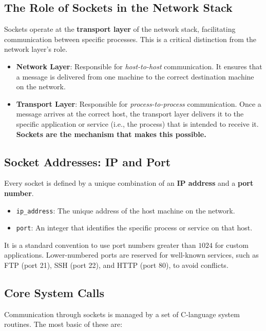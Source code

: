 \documentclass{article}
\begin{document}
\subsection{The Role of Sockets in the Network Stack}

Sockets operate at the \textbf{transport layer} of the network stack, facilitating communication between specific processes. This is a critical distinction from the network layer's role.


\begin{itemize}
    \item \textbf{Network Layer}: Responsible for \textit{host-to-host} communication. It ensures that a message is delivered from one machine to the correct destination machine on the network.
    \item \textbf{Transport Layer}: Responsible for \textit{process-to-process} communication. Once a message arrives at the correct host, the transport layer delivers it to the specific application or service (i.e., the process) that is intended to receive it. \textbf{Sockets are the mechanism that makes this possible.}
\end{itemize}

\subsection{Socket Addresses: IP and Port}

Every socket is defined by a unique combination of an \textbf{IP address} and a \textbf{port number}.

\begin{itemize}
    \item \texttt{ip\_address}: The unique address of the host machine on the network.
    \item \texttt{port}: An integer that identifies the specific process or service on that host.
\end{itemize}

It is a standard convention to use port numbers greater than $1024$ for custom applications. Lower-numbered ports are reserved for well-known services, such as FTP (port 21), SSH (port 22), and HTTP (port 80), to avoid conflicts.

\subsection{Core System Calls}

Communication through sockets is managed by a set of C-language system routines. The most basic of these are:
\end{document}
